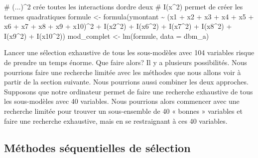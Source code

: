 \documentclass[
  11pt,
  letterpaper,
]{book}
\newenvironment{Shaded}{\begin{snugshade}}{\end{snugshade}}
\newcommand{\AttributeTok}[1]{\textcolor[rgb]{0.40,0.45,0.13}{#1}}
\newcommand{\CommentTok}[1]{\textcolor[rgb]{0.37,0.37,0.37}{#1}}
\newcommand{\DecValTok}[1]{\textcolor[rgb]{0.68,0.00,0.00}{#1}}
\newcommand{\FunctionTok}[1]{\textcolor[rgb]{0.28,0.35,0.67}{#1}}
\newcommand{\NormalTok}[1]{\textcolor[rgb]{0.00,0.23,0.31}{#1}}
\newcommand{\OtherTok}[1]{\textcolor[rgb]{0.00,0.23,0.31}{#1}}
\newcommand{\SpecialCharTok}[1]{\textcolor[rgb]{0.37,0.37,0.37}{#1}}
\theoremstyle{definition}
\theoremstyle{remark}
\begin{document}
\begin{Shaded}
\begin{Highlighting}[]
\CommentTok{\# (...)\^{}2 crée toutes les interactions d\textquotesingle{}ordre deux}
\CommentTok{\# I(x\^{}2) permet de créer les termes quadratiques}
\NormalTok{formule }\OtherTok{\textless{}{-}} 
  \FunctionTok{formula}\NormalTok{(ymontant }\SpecialCharTok{\textasciitilde{}} 
\NormalTok{          (x1 }\SpecialCharTok{+}\NormalTok{ x2 }\SpecialCharTok{+}\NormalTok{ x3 }\SpecialCharTok{+}\NormalTok{ x4 }\SpecialCharTok{+}\NormalTok{ x5 }\SpecialCharTok{+} 
\NormalTok{             x6 }\SpecialCharTok{+}\NormalTok{ x7 }\SpecialCharTok{+}\NormalTok{ x8 }\SpecialCharTok{+}\NormalTok{ x9 }\SpecialCharTok{+}\NormalTok{ x10)}\SpecialCharTok{\^{}}\DecValTok{2} \SpecialCharTok{+} 
            \FunctionTok{I}\NormalTok{(x2}\SpecialCharTok{\^{}}\DecValTok{2}\NormalTok{) }\SpecialCharTok{+} \FunctionTok{I}\NormalTok{(x6}\SpecialCharTok{\^{}}\DecValTok{2}\NormalTok{) }\SpecialCharTok{+} \FunctionTok{I}\NormalTok{(x7}\SpecialCharTok{\^{}}\DecValTok{2}\NormalTok{) }\SpecialCharTok{+}
            \FunctionTok{I}\NormalTok{(x8}\SpecialCharTok{\^{}}\DecValTok{2}\NormalTok{) }\SpecialCharTok{+} \FunctionTok{I}\NormalTok{(x9}\SpecialCharTok{\^{}}\DecValTok{2}\NormalTok{) }\SpecialCharTok{+} \FunctionTok{I}\NormalTok{(x10}\SpecialCharTok{\^{}}\DecValTok{2}\NormalTok{))}
\NormalTok{mod\_complet }\OtherTok{\textless{}{-}} \FunctionTok{lm}\NormalTok{(formule, }\AttributeTok{data =}\NormalTok{ dbm\_a)}
\end{Highlighting}
\end{Shaded}

Lancer une sélection exhaustive de tous les sous-modèles avec 104
variables risque de prendre un temps énorme. Que faire alors? Il y a
plusieurs possibilités. Nous pourrions faire une recherche limitée avec
les méthodes que nous allons voir à partir de la section suivante. Nous
pourrions aussi combiner les deux approches. Supposons que notre
ordinateur permet de faire une recherche exhaustive de tous les
sous-modèles avec 40 variables. Nous pourrions alors commencer avec une
recherche limitée pour trouver un sous-ensemble de 40 « bonnes »
variables et faire une recherche exhaustive, mais en se restraignant à
ces 40 variables.

\hypertarget{muxe9thodes-suxe9quentielles-de-suxe9lection}{%
\subsection{Méthodes séquentielles de
sélection}\label{muxe9thodes-suxe9quentielles-de-suxe9lection}}
\end{document}
